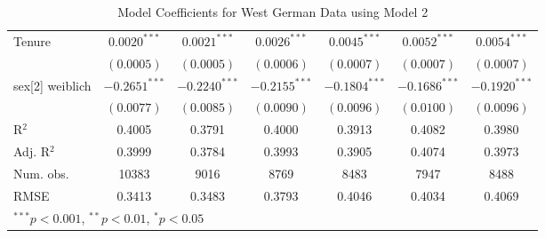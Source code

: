 \begin{table}
\begin{center}
\begin{small}
\begin{tabular}{l c c c c c c }
Tenure          & $0.0020^{***}$  & $0.0021^{***}$  & $0.0026^{***}$  & $0.0045^{***}$  & $0.0052^{***}$  & $0.0054^{***}$  \\
                & $(0.0005)$      & $(0.0005)$      & $(0.0006)$      & $(0.0007)$      & $(0.0007)$      & $(0.0007)$      \\
sex[2] weiblich & $-0.2651^{***}$ & $-0.2240^{***}$ & $-0.2155^{***}$ & $-0.1804^{***}$ & $-0.1686^{***}$ & $-0.1920^{***}$ \\
                & $(0.0077)$      & $(0.0085)$      & $(0.0090)$      & $(0.0096)$      & $(0.0100)$      & $(0.0096)$      \\
\hline
R$^2$           & 0.4005          & 0.3791          & 0.4000          & 0.3913          & 0.4082          & 0.3980          \\
Adj. R$^2$      & 0.3999          & 0.3784          & 0.3993          & 0.3905          & 0.4074          & 0.3973          \\
Num. obs.       & 10383           & 9016            & 8769            & 8483            & 7947            & 8488            \\
RMSE            & 0.3413          & 0.3483          & 0.3793          & 0.4046          & 0.4034          & 0.4069          \\
\hline
\multicolumn{7}{l}{\tiny{$^{***}p<0.001$, $^{**}p<0.01$, $^*p<0.05$}}
\end{tabular}
\end{small}
\caption{Model Coefficients for West German Data using Model 2}
\label{table:WestModelsOldNew}
\end{center}
\end{table}
